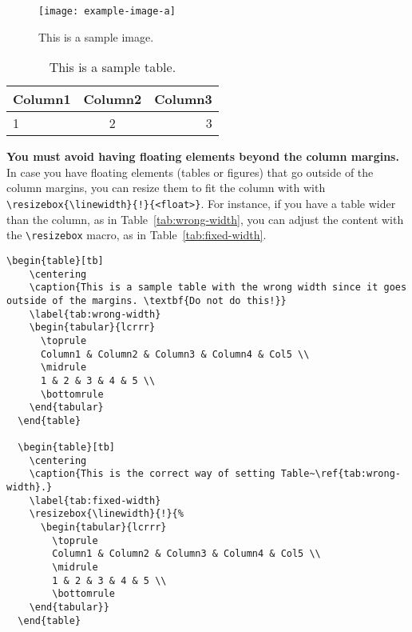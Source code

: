\documentclass[fullpaper]{nldl}
\begin{document}
\begin{enumerate}[leftmargin=*]
\begin{figure}[tb]
  \centering
  \texttt{[image: example-image-a]}
  \caption{This is a sample image.}
  \label{fig:sample}
\end{figure}

\begin{table}[tb]
  \centering
  \caption{This is a sample table.}
  \label{tab:sample}
  \begin{tabular}{lcr}
    \toprule
    Column1 & Column2 & Column3 \\
    \midrule
    1 & 2 & 3 \\
    \bottomrule
  \end{tabular}
\end{table}

\textbf{You must avoid having floating elements beyond the column margins.}
In case you have floating elements (tables or figures) that go outside of the column margins, you can resize them to fit the column with with \verb|\resizebox{\linewidth}{!}{<float>}|.
For instance, if you have a table wider than the column, as in Table~\ref{tab:wrong-width}, you can adjust the content with the \verb|\resizebox| macro, as in Table~\ref{tab:fixed-width}.
\begin{lstlisting}[gobble=2]
  \begin{table}[tb]
    \centering
    \caption{This is a sample table with the wrong width since it goes outside of the margins. \textbf{Do not do this!}}
    \label{tab:wrong-width}
    \begin{tabular}{lcrrr}
      \toprule
      Column1 & Column2 & Column3 & Column4 & Col5 \\
      \midrule
      1 & 2 & 3 & 4 & 5 \\
      \bottomrule
    \end{tabular}
  \end{table}

  \begin{table}[tb]
    \centering
    \caption{This is the correct way of setting Table~\ref{tab:wrong-width}.}
    \label{tab:fixed-width}
    \resizebox{\linewidth}{!}{%
      \begin{tabular}{lcrrr}
        \toprule
        Column1 & Column2 & Column3 & Column4 & Col5 \\
        \midrule
        1 & 2 & 3 & 4 & 5 \\
        \bottomrule
    \end{tabular}}
  \end{table}
\end{lstlisting}


\end{enumerate}
\end{document}
